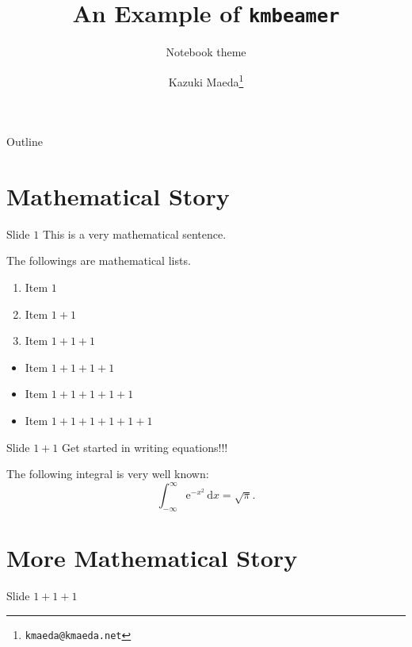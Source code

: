 \documentclass{beamer}
\title{An Example of \texttt{kmbeamer}}
\subtitle{Notebook theme}
\author{Kazuki Maeda\footnote{\texttt{kmaeda@kmaeda.net}}}
\begin{document}
\begin{frame}
  \maketitle
\end{frame}

\begin{frame}{Outline}
  \tableofcontents
\end{frame}

\section{Mathematical Story}

\begin{frame}{Slide $1$}
  This is a very mathematical sentence.

  \pause

  The followings are mathematical lists.

  \begin{enumerate}
  \item Item $1$\pause
  \item Item $1+1$\pause
  \item Item $1+1+1$
  \end{enumerate}

  \pause

  \begin{itemize}
  \item Item $1+1+1+1$\pause
  \item Item $1+1+1+1+1$\pause
  \item Item $1+1+1+1+1+1$
  \end{itemize}
\end{frame}

\begin{frame}{Slide $1+1$}
  \alert{Get started in writing equations!!!}

  \begin{theorem}
    The following integral is very well known:
    \begin{equation}
      \int_{-\infty}^\infty \mathrm{e}^{-x^2}\,\mathrm{d}x=\sqrt{\pi}.
    \end{equation}

  \end{theorem}
\end{frame}

\section{More Mathematical Story}
\begin{frame}{Slide $1+1+1$}
  \lipsum[1]
\end{frame}
\end{document}
